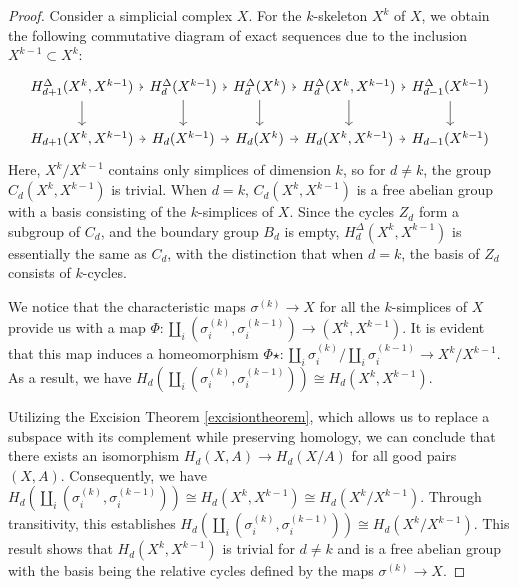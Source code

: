 \begin{proof}
Consider a simplicial complex $X$. For the $k$-skeleton $X^k$ of $X$, we obtain the following commutative diagram of exact sequences due to the inclusion $X^{k-1} \subset X^k$:
\begin{equation*}
\begin{tikzcd}[column sep=0.3em]
{H^\Delta_{d+1}(X^k,X^{k-1})} \arrow[d] \arrow[r] & H^\Delta_{d}(X^{k-1}) \arrow[d] \arrow[r] & H^\Delta_{d}(X^k) \arrow[d] \arrow[r] & {H^\Delta_{d}(X^k,X^{k-1})} \arrow[d] \arrow[r] & H^\Delta_{d-1}(X^{k-1}) \arrow[d] \\
{H_{d+1}(X^k,X^{k-1})} \arrow[r]                  & H_{d}(X^{k-1}) \arrow[r]                  & H_{d}(X^k) \arrow[r]                  & {H_{d}(X^k,X^{k-1})} \arrow[r]                  & H_{d-1}(X^{k-1})                 
\end{tikzcd}
\end{equation*}
Here, $X^k/X^{k-1}$ contains only simplices of dimension $k$, so for $d \neq k$, the group $C_d(X^k, X^{k-1})$ is trivial. When $d = k$, $C_d(X^k, X^{k-1})$ is a free abelian group with a basis consisting of the $k$-simplices of $X$. Since the cycles $Z_d$ form a subgroup of $C_d$, and the boundary group $B_d$ is empty, $H^\Delta_d(X^k, X^{k-1})$ is essentially the same as $C_d$, with the distinction that when $d = k$, the basis of $Z_d$ consists of $k$-cycles.

We notice that the characteristic maps $\sigma^{(k)} \rightarrow X$ for all the $k$-simplices of $X$ provide us with a map $\Phi: \coprod_i(\sigma^{(k)}_i, \sigma^{(k-1)}_i) \rightarrow (X^k, X^{k-1})$. It is evident that this map induces a homeomorphism $\Phi\star: \coprod_i \sigma^{(k)}_i/\coprod_i \sigma^{(k-1)}_i \rightarrow X^k/X^{k-1}$. As a result, we have $H_d(\coprod_i (\sigma^{(k)}_i, \sigma^{(k-1)}_i)) \cong H_d(X^k, X^{k-1})$.

Utilizing the Excision Theorem \ref{excisiontheorem}, which allows us to replace a subspace with its complement while preserving homology, we can conclude that there exists an isomorphism $H_d(X,A) \rightarrow H_d(X/A)$ for all good pairs $(X,A)$. Consequently, we have $H_d(\coprod_i (\sigma^{(k)}_i, \sigma^{(k-1)}_i)) \cong H_d(X^k, X^{k-1}) \cong H_d(X^k/X^{k-1})$. Through transitivity, this establishes $H_d(\coprod_i (\sigma^{(k)}_i, \sigma^{(k-1)}_i)) \cong H_d(X^k/X^{k-1})$. This result shows that $H_d(X^k, X^{k-1})$ is trivial for $d \neq k$ and is a free abelian group with the basis being the relative cycles defined by the maps $\sigma^{(k)} \rightarrow X$.


\end{proof}
